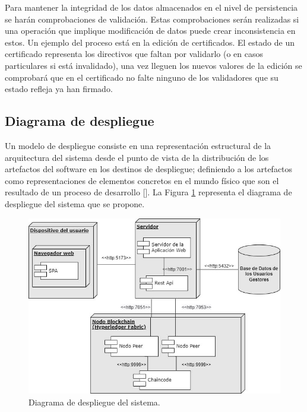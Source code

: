 Para mantener la integridad de los datos almacenados en el nivel de persistencia se harán comprobaciones de validación. Estas comprobaciones serán realizadas si una operación que implique modificación de datos puede crear inconsistencia en estos. Un ejemplo del proceso está en la edición de certificados. El estado de un certificado representa los directivos que faltan por validarlo (o en casos particulares si está invalidado), una vez lleguen los nuevos valores de la edición se comprobará que en el certificado no falte ninguno de los validadores que su estado refleja ya han firmado.

\subsection{Diagrama de despliegue}
Un modelo de despliegue consiste en una representación estructural de la arquitectura del sistema desde el punto de vista de la distribución de los artefactos del software en los destinos de despliegue; definiendo a los artefactos como representaciones de elementos concretos en el mundo físico que son el resultado de un proceso de desarrollo [\cite{91}]. La Figura \ref{fig:10} representa el diagrama de despliegue del sistema que se propone.

\begin{figure}[h]
	\centering
	\includegraphics[width=\linewidth]{Graphics/diagrama.png}
	\caption{Diagrama de despliegue del sistema.}
	\label{fig:10}
\end{figure}

